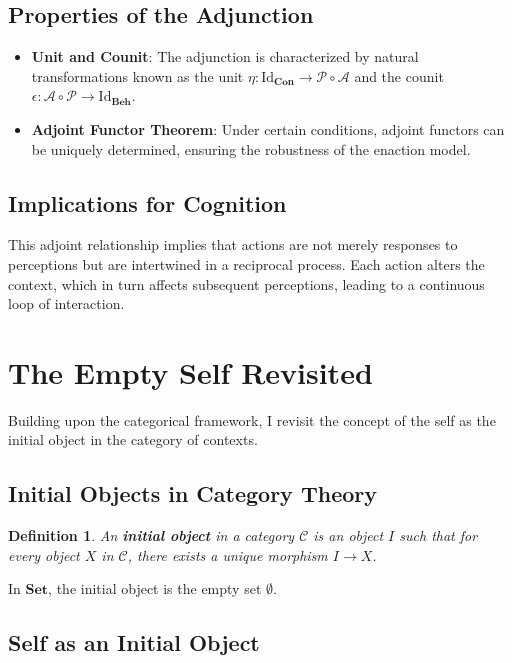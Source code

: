 \documentclass{article}
\newtheorem{definition}{Definition}[section]
\begin{document}
\subsection{Properties of the Adjunction}

\begin{itemize}
    \item \textbf{Unit and Counit}: The adjunction is characterized by natural transformations known as the unit $\eta \colon \text{Id}_{\mathbf{Con}} \to \mathcal{P} \circ \mathcal{A}$ and the counit $\epsilon \colon \mathcal{A} \circ \mathcal{P} \to \text{Id}_{\mathbf{Beh}}$.
    \item \textbf{Adjoint Functor Theorem}: Under certain conditions, adjoint functors can be uniquely determined, ensuring the robustness of the enaction model.
\end{itemize}

\subsection{Implications for Cognition}

This adjoint relationship implies that actions are not merely responses to perceptions but are intertwined in a reciprocal process. Each action alters the context, which in turn affects subsequent perceptions, leading to a continuous loop of interaction.

\section{The Empty Self Revisited}

Building upon the categorical framework, I revisit the concept of the self as the initial object in the category of contexts.

\subsection{Initial Objects in Category Theory}

\begin{definition}
An \textbf{initial object} in a category $\mathcal{C}$ is an object $I$ such that for every object $X$ in $\mathcal{C}$, there exists a unique morphism $I \to X$.
\end{definition}

In $\mathbf{Set}$, the initial object is the empty set $\emptyset$.

\subsection{Self as an Initial Object}
\end{document}
